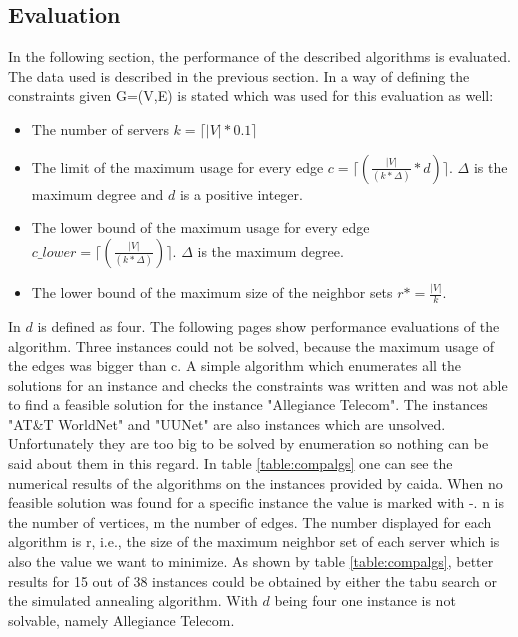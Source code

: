 \documentclass [12pt]{article}
\begin{document}
  \subsection{Evaluation}
  In the following section, the performance of the described algorithms is evaluated. The data used is described in the previous section.
  In \cite{caidabarebones} a way of defining the constraints given G=(V,E) is stated which was used for this evaluation as well: 
  \begin{itemize}
    \item{The number of servers $k = \lceil |V| * 0.1 \rceil$  }
    \item{The limit of the maximum usage for every edge $c = \lceil(\frac{|V|}{(k*\Delta)}*d)\rceil$. $\Delta$ is the maximum degree and $d$ is a positive integer.}
    \item{The lower bound of the maximum usage for every edge $c\_lower = \lceil(\frac{|V|}{(k*\Delta)})\rceil$. $\Delta$ is the maximum degree.}
    \item{The lower bound of the maximum size of the neighbor sets $r*=\frac{|V|}{k}$.}
  \end{itemize}
  In \cite{mirrorserver} $d$ is defined as four. %
  The following pages show performance evaluations of the algorithm.  Three instances could not be solved, because the maximum usage of the 
  edges was bigger than c. A simple algorithm which enumerates all the solutions for an instance and checks the constraints was written and was not able to find a feasible solution 
  for the instance "Allegiance Telecom". The instances  "AT\&T WorldNet" and "UUNet" are also instances which are unsolved. Unfortunately they are too big to be solved by enumeration so
  nothing can be said about them in this regard. In table \ref{table:compalgs} one can see the numerical results of the algorithms on the instances provided by caida. When no
  feasible solution was found for a specific instance the value is marked with -. n is the number of vertices, m the number of edges. The number displayed for each algorithm is r, i.e.,%
  the size of the maximum neighbor set of each server which is also the value we want to minimize. As shown by table \ref{table:compalgs}, better results for 15 out of 38 instances could be obtained 
  by either the tabu search or the simulated annealing algorithm. With $d$ being four one instance is not solvable, namely Allegiance Telecom. 
\end{document}
